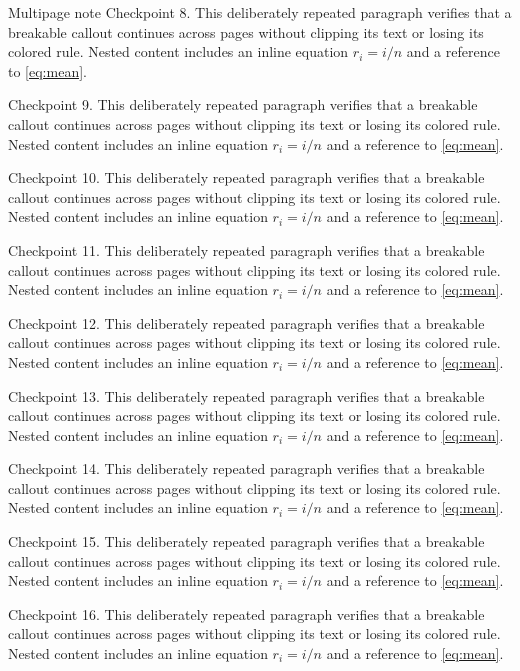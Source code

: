 \documentclass[algorithms,listings]{tempusreport}
\begin{document}
\begin{reportbox}{Multipage note}
Checkpoint 8. This deliberately repeated paragraph verifies that a breakable callout continues across pages without clipping its text or losing its colored rule. Nested content includes an inline equation $r_i=i/n$ and a reference to \cref{eq:mean}.

Checkpoint 9. This deliberately repeated paragraph verifies that a breakable callout continues across pages without clipping its text or losing its colored rule. Nested content includes an inline equation $r_i=i/n$ and a reference to \cref{eq:mean}.

Checkpoint 10. This deliberately repeated paragraph verifies that a breakable callout continues across pages without clipping its text or losing its colored rule. Nested content includes an inline equation $r_i=i/n$ and a reference to \cref{eq:mean}.

Checkpoint 11. This deliberately repeated paragraph verifies that a breakable callout continues across pages without clipping its text or losing its colored rule. Nested content includes an inline equation $r_i=i/n$ and a reference to \cref{eq:mean}.

Checkpoint 12. This deliberately repeated paragraph verifies that a breakable callout continues across pages without clipping its text or losing its colored rule. Nested content includes an inline equation $r_i=i/n$ and a reference to \cref{eq:mean}.

Checkpoint 13. This deliberately repeated paragraph verifies that a breakable callout continues across pages without clipping its text or losing its colored rule. Nested content includes an inline equation $r_i=i/n$ and a reference to \cref{eq:mean}.

Checkpoint 14. This deliberately repeated paragraph verifies that a breakable callout continues across pages without clipping its text or losing its colored rule. Nested content includes an inline equation $r_i=i/n$ and a reference to \cref{eq:mean}.

Checkpoint 15. This deliberately repeated paragraph verifies that a breakable callout continues across pages without clipping its text or losing its colored rule. Nested content includes an inline equation $r_i=i/n$ and a reference to \cref{eq:mean}.

Checkpoint 16. This deliberately repeated paragraph verifies that a breakable callout continues across pages without clipping its text or losing its colored rule. Nested content includes an inline equation $r_i=i/n$ and a reference to \cref{eq:mean}.


\end{reportbox}
\end{document}
